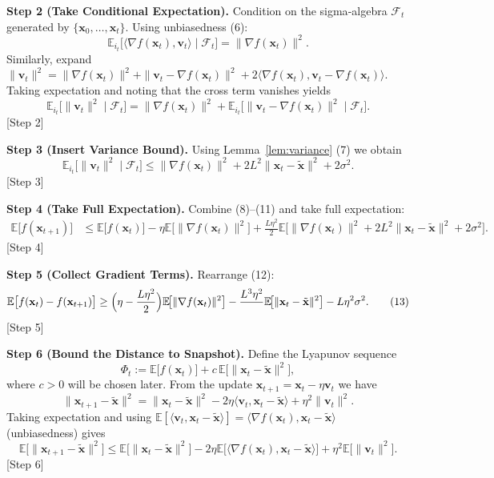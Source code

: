 \documentclass{article}
\newcommand{\EE}{\mathbb{E}}
\begin{document}
\noindent\textbf{Step 2 (Take Conditional Expectation).}  
Condition on the sigma‑algebra $\mathcal{F}_t$ generated by $\{\mathbf{x}_0,\dots,\mathbf{x}_t\}$. Using unbiasedness (6):
\[
\EE_{i_t}\!\bigl[\langle\nabla f(\mathbf{x}_t),\mathbf{v}_t\rangle\mid\mathcal{F}_t\bigr]
= \|\nabla f(\mathbf{x}_t)\|^{2}.
\tag{9}
\]
Similarly, expand $\|\mathbf{v}_t\|^{2}= \|\nabla f(\mathbf{x}_t)\|^{2}
+ \|\mathbf{v}_t-\nabla f(\mathbf{x}_t)\|^{2}
+2\langle\nabla f(\mathbf{x}_t),\mathbf{v}_t-\nabla f(\mathbf{x}_t)\rangle$.
Taking expectation and noting that the cross term vanishes yields
\[
\EE_{i_t}\!\bigl[\|\mathbf{v}_t\|^{2}\mid\mathcal{F}_t\bigr]
=\|\nabla f(\mathbf{x}_t)\|^{2}
+\EE_{i_t}\!\bigl[\|\mathbf{v}_t-\nabla f(\mathbf{x}_t)\|^{2}\mid\mathcal{F}_t\bigr].
\tag{10}
\]
[Step 2]

\noindent\textbf{Step 3 (Insert Variance Bound).}  
Using Lemma~\ref{lem:variance} (7) we obtain
\[
\EE_{i_t}\!\bigl[\|\mathbf{v}_t\|^{2}\mid\mathcal{F}_t\bigr]
\le \|\nabla f(\mathbf{x}_t)\|^{2}+2L^{2}\|\mathbf{x}_t-\tilde{\mathbf{x}}\|^{2}+2\sigma^{2}.
\tag{11}
\]
[Step 3]

\noindent\textbf{Step 4 (Take Full Expectation).}  
Combine (8)–(11) and take full expectation:
\begin{align}
\EE\bigl[f(\mathbf{x}_{t+1})\bigr]
&\le \EE\bigl[f(\mathbf{x}_t)\bigr]
-\eta\EE\!\bigl[\|\nabla f(\mathbf{x}_t)\|^{2}\bigr]
+\frac{L\eta^{2}}{2}\EE\!\bigl[\|\nabla f(\mathbf{x}_t)\|^{2}
+2L^{2}\|\mathbf{x}_t-\tilde{\mathbf{x}}\|^{2}+2\sigma^{2}\bigr].
\tag{12}
\end{align}
[Step 4]

\noindent\textbf{Step 5 (Collect Gradient Terms).}  
Rearrange (12):
\[
\EE\bigl[f(\mathbf{x}_{t})-f(\mathbf{x}_{t+1})\bigr]
\ge \Bigl(\eta-\frac{L\eta^{2}}{2}\Bigr)\EE\!\bigl[\|\nabla f(\mathbf{x}_t)\|^{2}\bigr]
-\frac{L^{3}\eta^{2}}{ } \EE\!\bigl[\|\mathbf{x}_t-\tilde{\mathbf{x}}\|^{2}\bigr]
- L\eta^{2}\sigma^{2}.
\tag{13}
\]
[Step 5]

\noindent\textbf{Step 6 (Bound the Distance to Snapshot).}  
Define the Lyapunov sequence
\[
\Phi_t:=\EE\!\bigl[f(\mathbf{x}_t)\bigr]+c\,\EE\!\bigl[\|\mathbf{x}_t-\tilde{\mathbf{x}}\|^{2}\bigr],
\tag{14}
\]
where $c>0$ will be chosen later.  
From the update $\mathbf{x}_{t+1}=\mathbf{x}_t-\eta\mathbf{v}_t$ we have
\[
\|\mathbf{x}_{t+1}-\tilde{\mathbf{x}}\|^{2}
= \|\mathbf{x}_t-\tilde{\mathbf{x}}\|^{2}
-2\eta\langle\mathbf{v}_t,\mathbf{x}_t-\tilde{\mathbf{x}}\rangle
+\eta^{2}\|\mathbf{v}_t\|^{2}.
\tag{15}
\]
Taking expectation and using $\EE[\langle\mathbf{v}_t,\mathbf{x}_t-\tilde{\mathbf{x}}\rangle]=\langle\nabla f(\mathbf{x}_t),\mathbf{x}_t-\tilde{\mathbf{x}}\rangle$ (unbiasedness) gives
\[
\EE\!\bigl[\|\mathbf{x}_{t+1}-\tilde{\mathbf{x}}\|^{2}\bigr]
\le \EE\!\bigl[\|\mathbf{x}_t-\tilde{\mathbf{x}}\|^{2}\bigr]
-2\eta\EE\!\bigl[\langle\nabla f(\mathbf{x}_t),\mathbf{x}_t-\tilde{\mathbf{x}}\rangle\bigr]
+\eta^{2}\EE\!\bigl[\|\mathbf{v}_t\|^{2}\bigr].
\tag{16}
\]
[Step 6]
\end{document}
